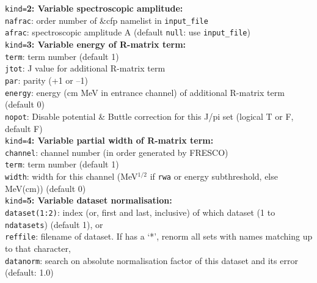\documentclass[11pt]{article}
\begin{document}
{\tt kind=}{\bf 2: Variable spectroscopic amplitude:}\\
{\tt nafrac}: order number of \&cfp namelist in {\tt input\_file}\\
{\tt afrac}: spectroscopic amplitude A (default {\tt null}: use {\tt input\_file})\\

{\tt kind=}{\bf 3: Variable energy of R-matrix term:}\\
{\tt term}: term number (default 1)\\
{\tt jtot}: J value for additional R-matrix term\\
{\tt par}: parity (+1 or --1)\\
{\tt energy}: energy (cm MeV in entrance channel) of additional R-matrix term (default 0)\\
{\tt nopot}: Disable potential \& Buttle correction for this J/pi set (logical T or F, default F)\\

{\tt kind=}{\bf 4: Variable partial width of R-matrix term:}\\
{\tt channel}: channel number (in order generated by FRESCO)\\
{\tt term}: term number (default 1)\\
{\tt width}: width for this channel (MeV$^{1/2}$ if {\tt rwa} or energy subthreshold, else MeV(cm)) (default 0)\\


{\tt kind=}{\bf 5: Variable dataset normalisation:}\\
{\tt dataset(1:2)}: index (or, first and last, inclusive) of which dataset (1 to {\tt ndatasets}) (default 1), or\\
{\tt reffile}: filename of dataset. If has a `*', renorm all sets with names matching up to that character,\\ 
{\tt datanorm}: search on absolute normalisation factor of this dataset and its error (default: 1.0)\\
\end{document}
